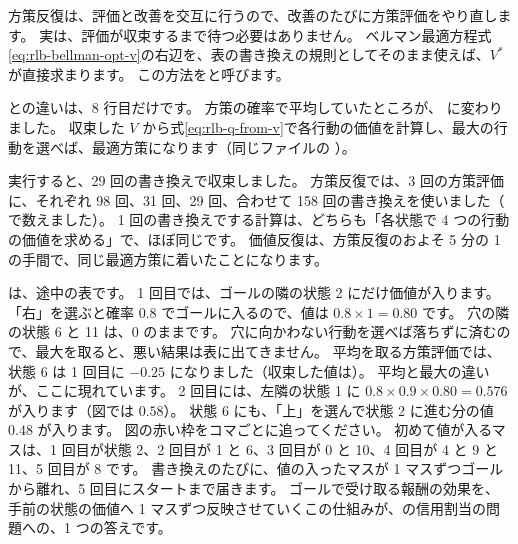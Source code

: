 方策反復は、評価と改善を交互に行うので、改善のたびに方策評価をやり直します。
実は、評価が収束するまで待つ必要はありません。
ベルマン最適方程式\eqref{eq:rlb-bellman-opt-v}の右辺を、表の書き換えの規則としてそのまま使えば、$V^\ast$ が直接求まります。
この方法をと呼びます。


との違いは、8 行目だけです。
方策の確率で平均していたところが、 に変わりました。
収束した $V$ から式\eqref{eq:rlb-q-from-v}で各行動の価値を計算し、最大の行動を選べば、最適方策になります（同じファイルの ）。

実行すると、29 回の書き換えで収束しました。
方策反復では、3 回の方策評価に、それぞれ 98 回、31 回、29 回、合わせて 158 回の書き換えを使いました（ で数えました）。
1 回の書き換えでする計算は、どちらも「各状態で 4 つの行動の価値を求める」で、ほぼ同じです。
価値反復は、方策反復のおよそ 5 分の 1 の手間で、同じ最適方策に着いたことになります。

は、途中の表です。
1 回目では、ゴールの隣の状態 2 にだけ価値が入ります。
「右」を選ぶと確率 0.8 でゴールに入るので、値は $0.8\times1=0.80$ です。
穴の隣の状態 6 と 11 は、0 のままです。
穴に向かわない行動を選べば落ちずに済むので、最大を取ると、悪い結果は表に出てきません。
平均を取る方策評価では、状態 6 は 1 回目に $-0.25$ になりました（収束した値は）。
平均と最大の違いが、ここに現れています。
2 回目には、左隣の状態 1 に $0.8\times0.9\times0.80=0.576$ が入ります（図では $0.58$）。
状態 6 にも、「上」を選んで状態 2 に進む分の値 $0.48$ が入ります。
図の赤い枠をコマごとに追ってください。
初めて値が入るマスは、1 回目が状態 2、2 回目が 1 と 6、3 回目が 0 と 10、4 回目が 4 と 9 と 11、5 回目が 8 です。
書き換えのたびに、値の入ったマスが 1 マスずつゴールから離れ、5 回目にスタートまで届きます。
ゴールで受け取る報酬の効果を、手前の状態の価値へ 1 マスずつ反映させていくこの仕組みが、の信用割当の問題への、1 つの答えです。

